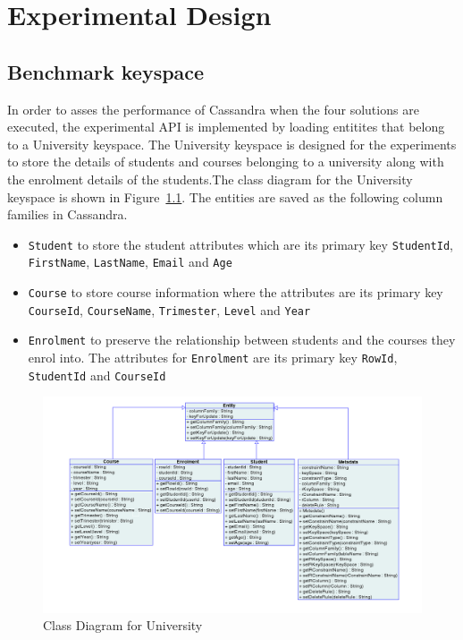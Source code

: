 \chapter{Experimental Design}



\section{Benchmark keyspace}
In order to asses the performance of Cassandra when the four solutions are
executed, the experimental \ac{API} is implemented by loading
 entitites that belong to a University keyspace. The University keyspace is
designed for the experiments to store the details of students and courses
belonging to a university along with the enrolment details of the students.The
class diagram for the University keyspace is shown in
Figure~\ref{fexp:ClassDiagram}. The entities are saved as the following column
families in Cassandra.

	\begin{itemize}
	  \item \texttt{Student} to store the student attributes which are its primary
	  key \texttt{StudentId}, \texttt{FirstName}, \texttt{LastName},
	  \texttt{Email} and \texttt{Age}
	  \item \texttt{Course} to store course information where the attributes are
	  its primary key \texttt{CourseId}, \texttt{CourseName}, \texttt{Trimester},
	  \texttt{Level} and \texttt{Year}
	  \item \texttt{Enrolment} to preserve the relationship between students and the
	  courses they enrol into. The attributes for \texttt{Enrolment} are its
	  primary key \texttt{RowId}, \texttt{StudentId} and \texttt{CourseId}
	\end{itemize}
	


	\begin{figure}[h] \centering
		\includegraphics[width=1\textwidth]{./figure/Solutions/classdiagram-experimental.png}
		\caption{Class Diagram for University}\label{fexp:ClassDiagram}
	\end{figure} 

